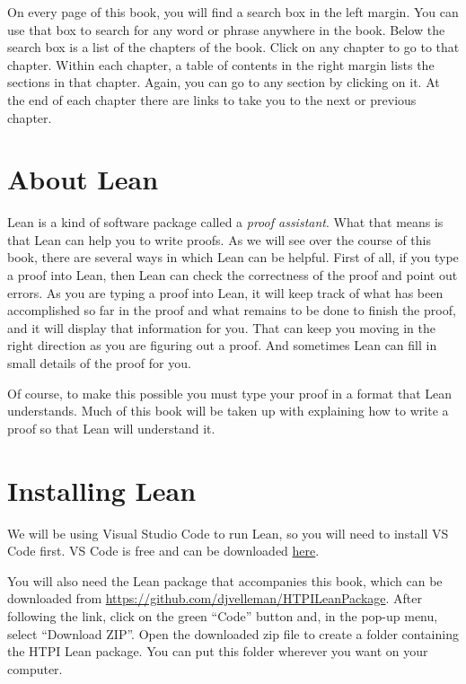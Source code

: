 \documentclass[
  letterpaper,
  DIV=11,
  numbers=noendperiod]{scrreprt}
\begin{document}
On every page of this book, you will find a search box in the left
margin. You can use that box to search for any word or phrase anywhere
in the book. Below the search box is a list of the chapters of the book.
Click on any chapter to go to that chapter. Within each chapter, a table
of contents in the right margin lists the sections in that chapter.
Again, you can go to any section by clicking on it. At the end of each
chapter there are links to take you to the next or previous chapter.

\hypertarget{about-lean}{%
\section*{About Lean}\label{about-lean}}

Lean is a kind of software package called a \emph{proof assistant}. What
that means is that Lean can help you to write proofs. As we will see
over the course of this book, there are several ways in which Lean can
be helpful. First of all, if you type a proof into Lean, then Lean can
check the correctness of the proof and point out errors. As you are
typing a proof into Lean, it will keep track of what has been
accomplished so far in the proof and what remains to be done to finish
the proof, and it will display that information for you. That can keep
you moving in the right direction as you are figuring out a proof. And
sometimes Lean can fill in small details of the proof for you.

Of course, to make this possible you must type your proof in a format
that Lean understands. Much of this book will be taken up with
explaining how to write a proof so that Lean will understand it.

\hypertarget{installing-lean}{%
\section*{Installing Lean}\label{installing-lean}}

We will be using Visual Studio Code to run Lean, so you will need to
install VS Code first. VS Code is free and can be downloaded
\href{https://code.visualstudio.com}{here}.

You will also need the Lean package that accompanies this book, which
can be downloaded from
\url{https://github.com/djvelleman/HTPILeanPackage}. After following the
link, click on the green ``Code'' button and, in the pop-up menu, select
``Download ZIP''. Open the downloaded zip file to create a folder
containing the HTPI Lean package. You can put this folder wherever you
want on your computer.
\end{document}
